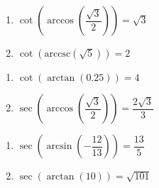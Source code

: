 \documentclass{ximera}
\begin{document}
\begin{multicols}{2}

\begin{enumerate}

\setcounter{enumi}{\value{HW}}

\item  $\cot\left(\arccos\left(\dfrac{\sqrt{3}}{2}\right)\right) = \sqrt{3}$
\item  $\cot\left(\text{arccsc}\left(\sqrt{5}\right)\right) = 2$ 

\setcounter{HW}{\value{enumi}}

\end{enumerate}

\end{multicols}

\begin{multicols}{2}

\begin{enumerate}

\setcounter{enumi}{\value{HW}}

\item  $\cot\left(\arctan \left( 0.25 \right)\right) = 4$ 
\item  $\sec\left(\arccos\left(\dfrac{\sqrt{3}}{2}\right)\right) = \dfrac{2\sqrt{3}}{3}$

\setcounter{HW}{\value{enumi}}

\end{enumerate}

\end{multicols}

\begin{multicols}{2}

\begin{enumerate}

\setcounter{enumi}{\value{HW}}

\item  $\sec\left(\arcsin\left(-\dfrac{12}{13}\right)\right) = \dfrac{13}{5}$
\item  $\sec\left(\arctan\left(10\right)\right) = \sqrt{101}$ 

\setcounter{HW}{\value{enumi}}

\end{enumerate}

\end{multicols}
\end{document}
